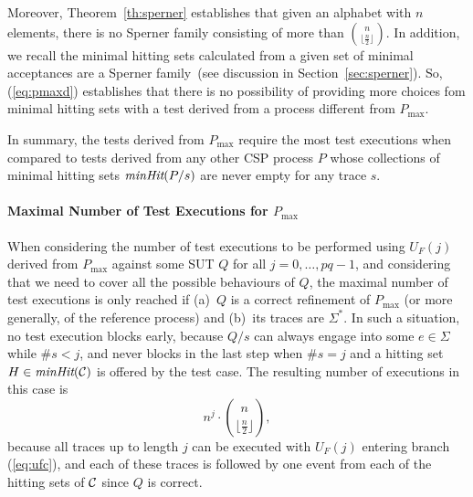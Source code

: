 \documentclass[3p,times]{elsarticle}
\newcommand{\trc}{\text{\it traces}}
\newcommand{\minhits}{\text{\it minHit}}
\newcommand{\pmax}{P_\text{max}}
\begin{document}
Moreover, Theorem~\ref{th:sperner} establishes that given an alphabet with
$n$ elements, there is no Sperner family consisting of more than
$\binom{n}{\lfloor\frac{n}{2}\rfloor}$. In addition, we recall the minimal
hitting sets calculated from a given set of minimal acceptances are a Sperner
family~(see discussion in Section~\ref{sec:sperner}). So, (\ref{eq:pmaxd})
establishes that there is no possibility of providing more choices fom
minimal hitting sets with a test derived from a process different from
$\pmax$.

In summary, the tests derived from $\pmax$ require the most test executions
when compared to tests derived from any other CSP process $P$ whose
collections of minimal hitting sets $\minhits(P/s)$ are never empty for any
trace $s$.

\paragraph{Maximal Number of Test Executions for $\pmax$}
When considering the number of test executions to be performed using $U_F(j)$
derived from $\pmax$ against some SUT $Q$ for all $j = 0,\dots,pq-1$, and
considering that we need to cover all the possible behaviours of $Q$, the
maximal number of test executions is only reached if (a)~$Q$ is a correct
refinement of $\pmax$ (or more generally, of the reference process) and
(b)~its traces are $\Sigma^*$.
%
In such a situation, no test execution blocks early, because $Q/s$ can always
engage into some $e\in\Sigma$  while $\#s<j$, and never blocks in the last
step when $\#s = j$ and a hitting set $H\in\minhits({\cal C})$ is offered by
the test case. The resulting number of executions in this case is
%
\begin{equation}
\label{eq:maxexec}
n^{j}\cdot \binom{n}{\lfloor\frac{n}{2}\rfloor},
\end{equation}
%
because all traces up to length $j$ can be executed with $U_F(j)$
entering branch (\ref{eq:ufc}), and each of these traces is followed by one
event from each of the hitting sets of ${\cal C}$ since $Q$ is correct.  %
\end{document}
